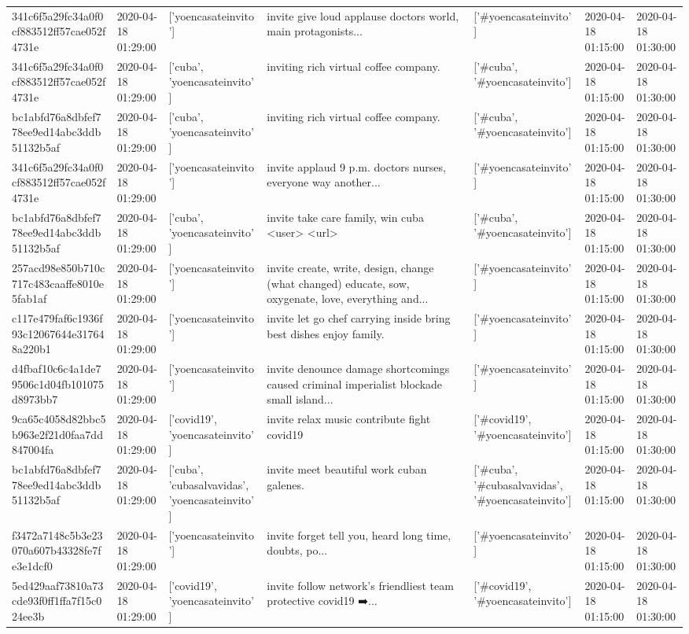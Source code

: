 \begin{tabular}{lllllll}
341c6f5a29fc34a0f0cf883512ff57cae052f4731e & 2020-04-18 01:29:00 & ['yoencasateinvito'] & invite give loud applause doctors world, main protagonists... & ['#yoencasateinvito'] & 2020-04-18 01:15:00 & 2020-04-18 01:30:00 \\
341c6f5a29fc34a0f0cf883512ff57cae052f4731e & 2020-04-18 01:29:00 & ['cuba', 'yoencasateinvito'] & inviting rich virtual coffee company. & ['#cuba', '#yoencasateinvito'] & 2020-04-18 01:15:00 & 2020-04-18 01:30:00 \\
bc1abfd76a8dbfef778ee9ed14abc3ddb51132b5af & 2020-04-18 01:29:00 & ['cuba', 'yoencasateinvito'] & inviting rich virtual coffee company. & ['#cuba', '#yoencasateinvito'] & 2020-04-18 01:15:00 & 2020-04-18 01:30:00 \\
341c6f5a29fc34a0f0cf883512ff57cae052f4731e & 2020-04-18 01:29:00 & ['yoencasateinvito'] & invite applaud 9 p.m. doctors nurses, everyone way another... & ['#yoencasateinvito'] & 2020-04-18 01:15:00 & 2020-04-18 01:30:00 \\
bc1abfd76a8dbfef778ee9ed14abc3ddb51132b5af & 2020-04-18 01:29:00 & ['cuba', 'yoencasateinvito'] & invite take care family, win cuba <user> <url> & ['#cuba', '#yoencasateinvito'] & 2020-04-18 01:15:00 & 2020-04-18 01:30:00 \\
257acd98e850b710c717c483caaffe8010e5fab1af & 2020-04-18 01:29:00 & ['yoencasateinvito'] & invite create, write, design, change (what changed) educate, sow, oxygenate, love, everything and... & ['#yoencasateinvito'] & 2020-04-18 01:15:00 & 2020-04-18 01:30:00 \\
c117e479faf6c1936f93c12067644e317648a220b1 & 2020-04-18 01:29:00 & ['yoencasateinvito'] & invite let go chef carrying inside bring best dishes enjoy family. & ['#yoencasateinvito'] & 2020-04-18 01:15:00 & 2020-04-18 01:30:00 \\
d4fbaf10c6c4a1de79506c1d04fb101075d8973bb7 & 2020-04-18 01:29:00 & ['yoencasateinvito'] & invite denounce damage shortcomings caused criminal imperialist blockade small island... & ['#yoencasateinvito'] & 2020-04-18 01:15:00 & 2020-04-18 01:30:00 \\
9ca65c4058d82bbc5b963e2f21d0faa7dd847004fa & 2020-04-18 01:29:00 & ['covid19', 'yoencasateinvito'] & invite relax music contribute fight covid19 & ['#covid19', '#yoencasateinvito'] & 2020-04-18 01:15:00 & 2020-04-18 01:30:00 \\
bc1abfd76a8dbfef778ee9ed14abc3ddb51132b5af & 2020-04-18 01:29:00 & ['cuba', 'cubasalvavidas', 'yoencasateinvito'] & invite meet beautiful work cuban galenes. & ['#cuba', '#cubasalvavidas', '#yoencasateinvito'] & 2020-04-18 01:15:00 & 2020-04-18 01:30:00 \\
f3472a7148c5b3e23070a607b43328fe7fe3e1dcf0 & 2020-04-18 01:29:00 & ['yoencasateinvito'] & invite forget tell you, heard long time, doubts, po... & ['#yoencasateinvito'] & 2020-04-18 01:15:00 & 2020-04-18 01:30:00 \\
5ed429aaf73810a73cde93f0ff1ffa7f15c024ee3b & 2020-04-18 01:29:00 & ['covid19', 'yoencasateinvito'] & invite follow network's friendliest team protective covid19 ➡️... & ['#covid19', '#yoencasateinvito'] & 2020-04-18 01:15:00 & 2020-04-18 01:30:00 \\
\bottomrule
\end{tabular}
